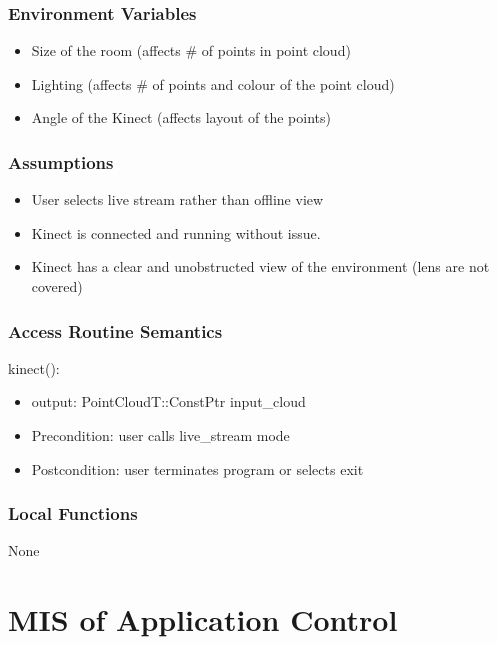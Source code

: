 \documentclass[12pt, titlepage]{article}
\begin{document}
\subsubsection{Environment Variables}

\begin{itemize}
  \item Size of the room (affects \# of points in point cloud)
  \item Lighting (affects \# of points and colour of the point cloud)
  \item Angle of the Kinect (affects layout of the points)
\end{itemize}

\subsubsection{Assumptions}

\begin{itemize}
  \item User selects live stream rather than offline view
  \item Kinect is connected and running without issue.
  \item Kinect has a clear and unobstructed view of the environment (lens are not covered)
\end{itemize}

\subsubsection{Access Routine Semantics}

\noindent kinect():
\begin{itemize}
  \item output: PointCloudT::ConstPtr input\_cloud
  \item Precondition: user calls live\_stream mode
  \item Postcondition: user terminates program or selects exit 
\end{itemize}

\subsubsection{Local Functions}

None

\newpage

\section{MIS of Application Control} \label{ModuleAC} 
\end{document}

